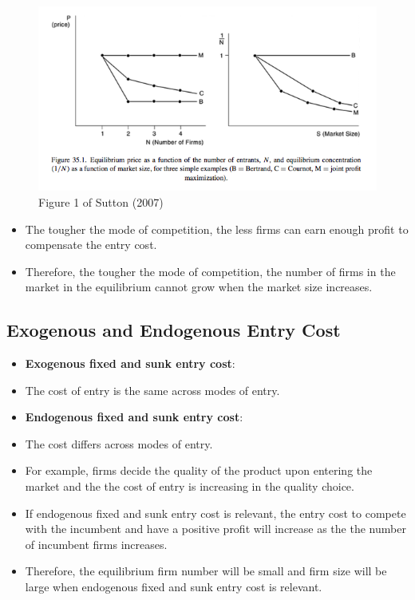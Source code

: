 \documentclass[]{book}
\providecommand{\tightlist}{%
  \setlength{\itemsep}{0pt}\setlength{\parskip}{0pt}}
\begin{document}
\begin{figure}

{\centering \includegraphics[width=0.8\linewidth]{figuretable/entrycost} 

}

\caption{Figure 1 of Sutton (2007)}\label{fig:unnamed-chunk-26}
\end{figure}

\begin{itemize}
\tightlist
\item
  The tougher the mode of competition, the less firms can earn enough
  profit to compensate the entry cost.
\item
  Therefore, the tougher the mode of competition, the number of firms in
  the market in the equilibrium cannot grow when the market size
  increases.
\end{itemize}

\subsection{Exogenous and Endogenous Entry
Cost}\label{exogenous-and-endogenous-entry-cost}

\begin{itemize}
\tightlist
\item
  \textbf{Exogenous fixed and sunk entry cost}:
\item
  The cost of entry is the same across modes of entry.
\item
  \textbf{Endogenous fixed and sunk entry cost}:
\item
  The cost differs across modes of entry.
\item
  For example, firms decide the quality of the product upon entering the
  market and the the cost of entry is increasing in the quality choice.
\item
  If endogenous fixed and sunk entry cost is relevant, the entry cost to
  compete with the incumbent and have a positive profit will increase as
  the the number of incumbent firms increases.
\item
  Therefore, the equilibrium firm number will be small and firm size
  will be large when endogenous fixed and sunk entry cost is relevant.
\end{itemize}
\end{document}
